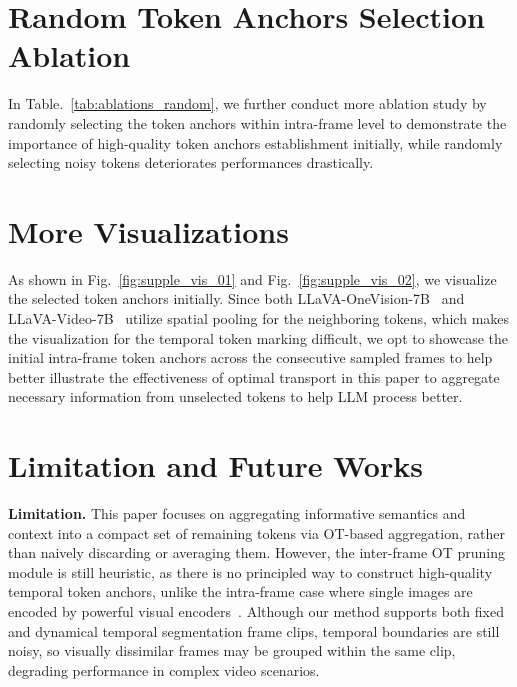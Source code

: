 \section{Random Token Anchors Selection Ablation}
\label{sec:random}

In Table.~\ref{tab:ablations_random}, we further conduct more ablation study by randomly selecting the token anchors within intra-frame level to demonstrate the importance of high-quality token anchors establishment initially, while randomly selecting noisy tokens deteriorates performances drastically.


\section{More Visualizations}
\label{sec:visualization}

As shown in Fig.~\ref{fig:supple_vis_01} and Fig.~\ref{fig:supple_vis_02}, we visualize the selected token anchors initially. Since both LLaVA-OneVision-7B~\cite{li2024llava} and LLaVA-Video-7B~\cite{zhang2024video} utilize spatial pooling for the neighboring tokens, which makes the visualization for the temporal token marking difficult, we opt to showcase the initial intra-frame token anchors across the consecutive sampled frames to help better illustrate the effectiveness of optimal transport in this paper to aggregate necessary information from unselected tokens to help LLM process better.


\section{Limitation and Future Works}
\label{sec:limit_future}
\noindent \textbf{Limitation.}
This paper focuses on aggregating informative semantics and context into a compact set of remaining tokens via OT-based aggregation, rather than naively discarding or averaging them.
However, the inter-frame OT pruning module is still heuristic, as there is no principled way to construct high-quality temporal token anchors, unlike the intra-frame case where single images are encoded by powerful visual encoders~\cite{radford2021learning,zhai2023sigmoid}.
Although our method supports both fixed and dynamical temporal segmentation frame clips, temporal boundaries are still noisy, so visually dissimilar frames may be grouped within the same clip, degrading performance in complex video scenarios.

